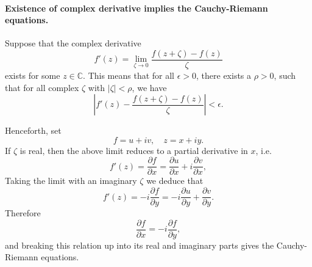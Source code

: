 \documentclass[12pt]{article}
\newcommand{\cnums}{\mathbb{C}}
\begin{document}
\paragraph{Existence of complex derivative implies the Cauchy-Riemann
  equations.}

Suppose that the complex
derivative
\begin{equation}
  \label{eq:cder}
f'(z) = \lim_{\zeta\rightarrow 0} \frac{f(z+\zeta)-f(z)}{\zeta}  
\end{equation}
exists for some $z\in \cnums$. 
This means that for all $\epsilon>0$, there exists a $\rho>0$, such that
for all complex $\zeta$ with
$\vert \zeta\vert<\rho$, we have
$$\left\vert f'(z)  - \frac{f(z+\zeta)-f(z)}{\zeta} \right \vert<\epsilon.$$

Henceforth, set
$$f=u+iv,\quad z=x+iy.$$
If $\zeta$ is
real, then the above limit reduces to a partial derivative in $x$, i.e.
$$f'(z) = \frac{\partial f}{\partial x} = \frac{\partial u}{\partial
  x} + i \frac{\partial v}{\partial x},$$
Taking the limit with an
imaginary $\zeta$ we deduce that
$$f'(z) = -i\frac{\partial f}{\partial y} = -i \frac{\partial u}{\partial
  y} + \frac{\partial v}{\partial y}.$$
Therefore
$$\frac{\partial f}{\partial x} = -i\frac{\partial f}{\partial y},$$
and breaking this relation up into its real and imaginary parts gives
the Cauchy-Riemann equations.
\end{document}
